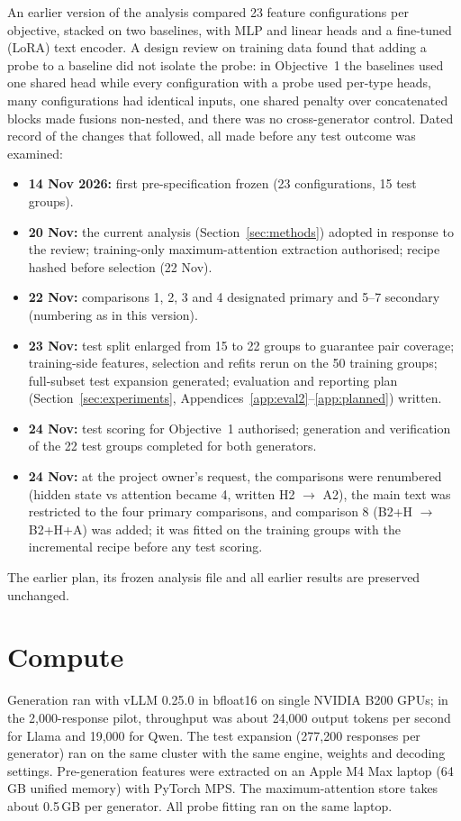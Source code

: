 \documentclass{article}
\newcommand{\cto}{$\rightarrow$}
\begin{document}
An earlier version of the analysis compared 23 feature configurations per objective, stacked on two baselines, with MLP
and linear heads and a fine-tuned (LoRA) text encoder. A design review on training data found that adding a probe to a
baseline did not isolate the probe: in Objective~1 the baselines used one shared head while every configuration with a
probe used per-type heads, many configurations had identical inputs, one shared penalty over concatenated blocks made
fusions non-nested, and there was no cross-generator control. Dated record of the changes that followed, all made
before any test outcome was examined:
\begin{itemize}
\item \textbf{14 Nov 2026:} first pre-specification frozen (23 configurations, 15 test groups).
\item \textbf{20 Nov:} the current analysis (Section~\ref{sec:methods}) adopted in response to the review; training-only
maximum-attention extraction authorised; recipe hashed before selection (22 Nov).
\item \textbf{22 Nov:} comparisons 1, 2, 3 and 4 designated primary and 5--7 secondary (numbering as in this version).
\item \textbf{23 Nov:} test split enlarged from 15 to 22 groups to guarantee pair coverage; training-side features,
selection and refits rerun on the 50 training groups; full-subset test expansion generated; evaluation and reporting
plan (Section~\ref{sec:experiments}, Appendices~\ref{app:eval2}--\ref{app:planned}) written.
\item \textbf{24 Nov:} test scoring for Objective~1 authorised; generation and verification of the 22 test groups
completed for both generators.
\item \textbf{24 Nov:} at the project owner's request, the comparisons were renumbered (hidden state vs attention became 4,
written H2 \cto{} A2), the main text was restricted to the four primary comparisons, and comparison 8 (B2+H \cto{} B2+H+A)
was added; it was fitted on the training groups with the incremental recipe before any test scoring.
\end{itemize}
The earlier plan, its frozen analysis file and all earlier results are preserved unchanged.

\section{Compute}
\label{app:compute}

Generation ran with vLLM 0.25.0 in bfloat16 on single NVIDIA B200 GPUs; in the 2,000-response pilot, throughput was
about 24,000 output tokens per second for Llama and 19,000 for Qwen. The test expansion (277,200 responses per
generator) ran on the same cluster with the same engine, weights and decoding settings. Pre-generation features were extracted on an Apple
M4 Max laptop (64\,GB unified memory) with PyTorch MPS. The maximum-attention store takes about 0.5\,GB per generator.
All probe fitting ran on the same laptop.
\end{document}
